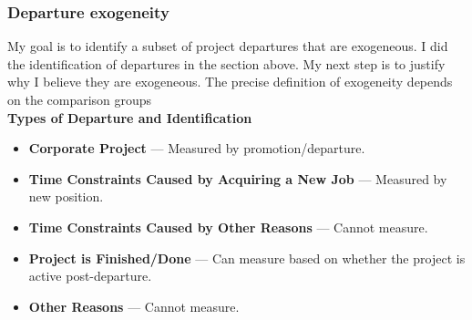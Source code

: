 \documentclass[source/paper/main.tex]{subfiles}
\begin{document}
\subsubsection{Departure exogeneity }
My goal is to identify a subset of project departures that are exogeneous. I did the identification of departures in the section above. My next step is to justify why I believe they are exogeneous. The precise definition of exogeneity depends on the comparison groups\\
\textbf{Types of Departure and Identification}
\begin{itemize}
    \item \textbf{Corporate Project} --- Measured by promotion/departure.
    \item \textbf{Time Constraints Caused by Acquiring a New Job} --- Measured by new position.
    \item \textbf{Time Constraints Caused by Other Reasons} --- Cannot measure.
    \item \textbf{Project is Finished/Done} --- Can measure based on whether the project is active post-departure.
    \item \textbf{Other Reasons} --- Cannot measure.
\end{itemize}
\end{document}
